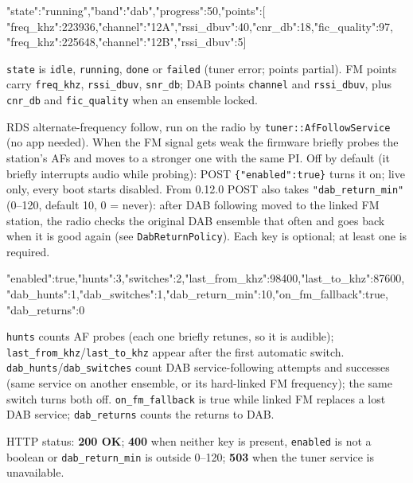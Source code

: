 \begin{drcode}[JSON]
{"state":"running","band":"dab","progress":50,"points":[
 {"freq_khz":223936,"channel":"12A","rssi_dbuv":40,"cnr_db":18,"fic_quality":97},
 {"freq_khz":225648,"channel":"12B","rssi_dbuv":5}]}
\end{drcode}
\texttt{state} is \texttt{idle}, \texttt{running}, \texttt{done} or
\texttt{failed} (tuner error; points partial). FM points carry
\texttt{freq\_khz}, \texttt{rssi\_dbuv}, \texttt{snr\_db}; DAB points
\texttt{channel} and \texttt{rssi\_dbuv}, plus \texttt{cnr\_db} and
\texttt{fic\_quality} when an ensemble locked.

\label{sec:api-tuner-af}

RDS alternate-frequency follow, run on the radio by
\texttt{tuner::AfFollowService} (no app needed). When the FM signal gets
weak the firmware briefly probes the station's AFs and moves to a stronger
one with the same PI. Off by default (it briefly interrupts audio while
probing): POST \texttt{\{"enabled":true\}} turns it on; live only, every
boot starts disabled. From 0.12.0 POST also takes
\texttt{"dab\_return\_min"} (0--120, default 10, 0 = never): after DAB
following moved to the linked FM station, the radio checks the original
DAB ensemble that often and goes back when it is good again (see
\texttt{DabReturnPolicy}). Each key is optional; at least one is required.

\begin{drnote}
\begin{drcode}[JSON]
{"enabled":true,"hunts":3,"switches":2,"last_from_khz":98400,"last_to_khz":87600,
 "dab_hunts":1,"dab_switches":1,"dab_return_min":10,"on_fm_fallback":true,
 "dab_returns":0}
\end{drcode}
\texttt{hunts} counts AF probes (each one briefly retunes, so it is
audible); \texttt{last\_from\_khz}/\texttt{last\_to\_khz} appear after the
first automatic switch. \texttt{dab\_hunts}/\texttt{dab\_switches} count DAB
service-following attempts and successes (same service on another
ensemble, or its hard-linked FM frequency); the same switch turns both off.
\texttt{on\_fm\_fallback} is true while linked FM replaces a lost DAB
service; \texttt{dab\_returns} counts the returns to DAB.
\end{drnote}

HTTP status: \textbf{200 OK}; \textbf{400} when neither key is present,
\texttt{enabled} is not a boolean or \texttt{dab\_return\_min} is outside
0--120; \textbf{503} when the tuner service is unavailable.

